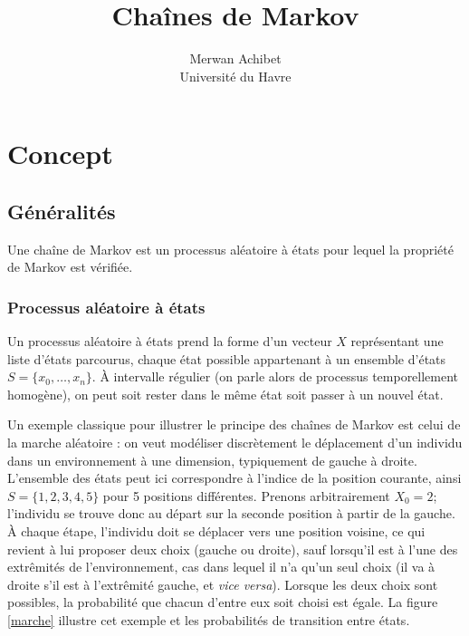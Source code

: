 \documentclass[12pt]{article}
\title{Chaînes de Markov}
\author{Merwan Achibet\\Université du Havre}
\date{}
\begin{document}
\maketitle

\section{Concept}

\subsection{Généralités}

Une chaîne de Markov est un processus aléatoire à états pour lequel la
propriété de Markov est vérifiée.

\subsubsection{Processus aléatoire à états}

Un processus aléatoire à états prend la forme d'un vecteur $X$
représentant une liste d'états parcourus, chaque état possible
appartenant à un ensemble d'états $S = \{x_0, \dots, x_n \}$. \`A
intervalle régulier (on parle alors de processus temporellement
homogène), on peut soit rester dans le même état soit passer à un
nouvel état.

Un exemple classique pour illustrer le principe des chaînes de Markov
est celui de la marche aléatoire \cite{ocone} : on veut modéliser
discrètement le déplacement d'un individu dans un environnement à une
dimension, typiquement de gauche à droite. L'ensemble des états peut
ici correspondre à l'indice de la position courante, ainsi $S = \{1,
2, 3, 4, 5\}$ pour 5 positions différentes. Prenons arbitrairement
$X_0 = 2$; l'individu se trouve donc au départ sur la seconde position
à partir de la gauche. \`A chaque étape, l'individu doit se déplacer
vers une position voisine, ce qui revient à lui proposer deux choix
(gauche ou droite), sauf lorsqu'il est à l'une des extrêmités de
l'environnement, cas dans lequel il n'a qu'un seul choix (il va à
droite s'il est à l'extrêmité gauche, et \textit{vice versa}). Lorsque
les deux choix sont possibles, la probabilité que chacun d'entre eux
soit choisi est égale. La figure \ref{marche} illustre cet exemple et
les probabilités de transition entre états.
\end{document}
